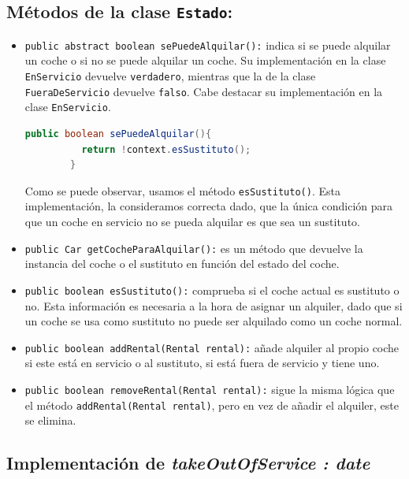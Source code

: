 \subsection*{Métodos de la clase \texttt{Estado}:}
\begin{itemize}
    \item \texttt{public abstract boolean sePuedeAlquilar():} indica si se puede alquilar un coche o si no se puede alquilar un coche. Su implementación en la clase \texttt{EnServicio} 
    devuelve \texttt{verdadero}, mientras que la de la clase \texttt{FueraDeServicio} devuelve \texttt{falso}. Cabe destacar su implementación en la clase \texttt{EnServicio}.
    \begin{lstlisting}[style = javaNormal, language=Java]
        public boolean sePuedeAlquilar(){
          return !context.esSustituto();
        }    
    \end{lstlisting}
    Como se puede observar, usamos el método \texttt{esSustituto()}. Esta implementación, la consideramos correcta dado, que la única condición para 
    que un coche en servicio no se pueda alquilar es que sea un sustituto.       
    \item \texttt{public Car getCocheParaAlquilar():} es un método que devuelve la instancia del coche o el sustituto en función 
    del estado del coche. 
    \item \texttt{public boolean esSustituto():} comprueba si el coche actual es sustituto o no. Esta información es necesaria a la hora de 
    asignar un alquiler, dado que si un coche se usa como sustituto no puede ser alquilado como un coche normal.
    \item \texttt{public boolean addRental(Rental rental):} añade alquiler al propio coche si este está en servicio o al sustituto, si está fuera
    de servicio y tiene uno.
    \item \texttt{public boolean removeRental(Rental rental):} sigue la misma lógica que el método \texttt{addRental(Rental rental)}, pero en vez de añadir
    el alquiler, este se elimina.
    
\end{itemize}


\subsection{Implementación de \textit{takeOutOfService : date}}

\newpage
